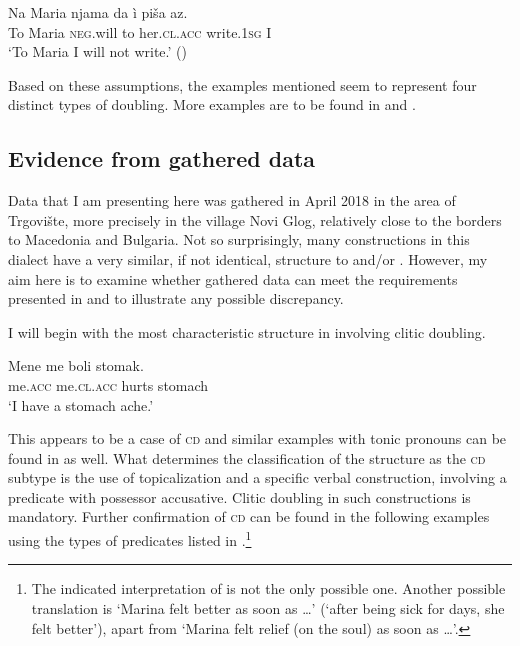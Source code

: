\documentclass[output=paper,
colorlinks,
citecolor=brown,
newtxmath
]{langscibook}
\begin{document}

\ea\label{ex:zivojinovic:9}
\gll Na Maria  njama    da  ì           piša       az.\\
     To Maria  \textsc{neg}.will to  her.\textsc{cl.acc}  write.\textsc{1sg}  I\\
\glt `To Maria I will not write.’
\hfill ()
\z

\noindent Based on these assumptions, the examples mentioned seem to represent four distinct types of doubling. More examples are to be found in \citet{Krapova.Karastaneva2002} and \citet{Cinque.Krapova2008}.

\subsection{Evidence from gathered data}                            %
\label{subsec:evidence}
Data that I am presenting here was gathered in April 2018 in the area of Trgovište, more precisely in the village Novi Glog, relatively close to the borders to Macedonia and Bulgaria. Not so surprisingly, many constructions in this dialect have a very similar, if not identical, structure to  and/or . However, my aim here is to examine whether gathered data can meet the requirements presented in \citet{Cinque.Krapova2008} and to illustrate any possible discrepancy.

I will begin with the most characteristic structure in  involving clitic doubling.


\ea\label{ex:zivojinovic:10}
\gll Mene   me        boli  stomak.\\
     me.\textsc{acc} me.\textsc{cl.acc} hurts stomach \\
\glt `I have a stomach ache.'
\z

\noindent This appears to be a case of \textsc{cd} and similar examples with tonic pronouns can be found in  as well. What determines the classification of the structure as the \textsc{cd} subtype is the use of topicalization and a specific verbal construction, involving a predicate with possessor accusative. Clitic doubling in such constructions is mandatory.
Further confirmation of \textsc{cd} can be found in the following examples using the types of predicates listed in \citet{Cinque.Krapova2008}.\footnote{The indicated interpretation of  is not the only possible one. Another possible translation is `Marina felt better as soon as {\dots}' (`after being sick for days, she felt better'), apart from `Marina felt relief (on the soul) as soon as {\dots}'.}
\end{document}
